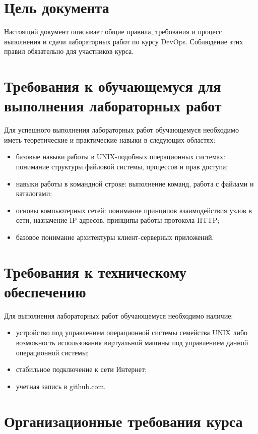 \documentclass[12pt,a4paper]{article}
\begin{document}
\makelabcover

\section{Цель документа}

Настоящий документ описывает общие правила, требования и процесс выполнения и сдачи лабораторных работ по курсу DevOps. Соблюдение этих правил обязательно для участников курса.

\section{Требования к обучающемуся для выполнения лабораторных работ}
Для успешного выполнения лабораторных работ обучающемуся необходимо иметь теоретические и практические навыки в следующих областях:
\begin{itemize}
    \item базовые навыки работы в UNIX-подобных операционных системах: понимание структуры файловой системы, процессов и прав доступа;
    \item навыки работы в командной строке: выполнение команд, работа с файлами и каталогами;
    \item основы компьютерных сетей: понимание принципов взаимодействия узлов в сети, назначение IP-адресов, принципы работы протокола HTTP;
    \item базовое понимание архитектуры клиент-серверных приложений.
\end{itemize}

\section{Требования к техническому обеспечению}
Для выполнения лабораторных работ обучающемуся необходимо наличие:
\begin{itemize}
    \item устройство под управлением операционной системы семейства UNIX либо возможность использования виртуальной машины под управлением данной операционной системы;
    \item стабильное подключение к сети Интернет;
    \item учетная запись в github.com.
\end{itemize}

\section{Организационные требования курса}
\end{document}
